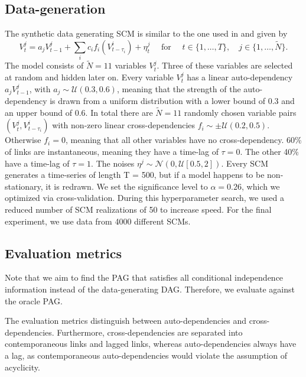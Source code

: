 \documentclass[conference]{IEEEtran}
\begin{document}
\subsection{Data-generation}
The synthetic data generating SCM is similar to the one used in \cite{gerhardus_high-recall_2021} and given by
\begin{equation}
V_{t}^{j}=a_{j} V_{t-1}^{j}+\sum_{i} c_{i} f_{i}\left(V_{t-\tau_{i}}^{i}\right)+\eta_{t}^{j} \quad \text { for } \quad t \in\{1, \ldots, T\}, \quad j \in\{1, \ldots, \tilde{N} \}.
\end{equation}
The model consists of $\tilde{N}=11$ variables $V_t^j$. Three of these variables are selected at random and hidden later on.
Every variable $V_t^j$ has a linear auto-dependency $a_j V_{t-1}^{j}$, with $a_j \sim \mathcal{U}(0.3,0.6)$, meaning that the strength of the auto-dependency is drawn from a uniform distribution with a lower bound of 0.3 and an upper bound of 0.6.
In total there are $\tilde{N}=11$ randomly chosen variable pairs $(V_t^j,V^i_{t-\tau_i})$ with non-zero linear cross-dependencies $f_i \sim \pm \mathcal{U}(0.2,0.5)$. Otherwise $f_i=0$, meaning that all other variables have no cross-dependency.
60\% of links are instantaneous, meaning they have a time-lag of $\tau =0$. The other 40\% have a time-lag of $\tau=1$.
The noises $\eta^{j} \sim \mathcal{N}(0,\mathcal{U}[0.5,2])$.
Every SCM generates a time-series of length T = 500, but if a model happens to be non-stationary, it is redrawn.
We set the significance level to $\alpha =0.26$, which we optimized via cross-validation. During this hyperparameter search, we used a reduced number of SCM realizations of 50 to increase speed.
For the final experiment, we use data from 4000 different SCMs.


\subsection{Evaluation metrics}
Note that we aim to find the PAG that satisfies all conditional independence information instead of the data-generating DAG. Therefore, we evaluate against the oracle PAG.

The evaluation metrics distinguish between auto-dependencies and cross-dependencies. 
Furthermore, cross-dependencies are separated into contemporaneous links and lagged links, whereas auto-dependencies always have a lag, as contemporaneous auto-dependencies would violate the assumption of acyclicity.
\end{document}
